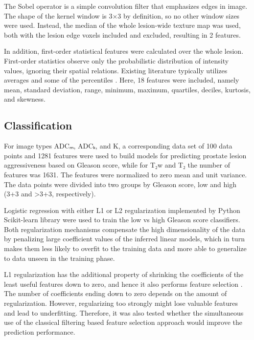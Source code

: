 \documentclass[10pt,letterpaper]{article}
\newcommand{\citep}{\cite}
\begin{document}
The Sobel operator \citep{Sobel1990} is a simple convolution filter that
emphasizes edges in image. The shape of the kernel window is 3×3 by definition,
so no other window sizes were used. Instead, the median of the whole lesion-wide
texture map was used, both with the lesion edge voxels included and excluded,
resulting in 2 features.

In addition, first-order statistical features were calculated over the whole
lesion. First-order statistics observe only the probabilistic distribution of
intensity values, ignoring their spatial relations. Existing literature
typically utilizes averages and some of the percentiles \citep{Shaish2016}.
Here, 18 features were included, namely mean, standard deviation, range,
minimum, maximum, quartiles, deciles, kurtosis, and skewness.


\subsection{Classification}

For image types ADCₘ, ADCₖ, and K, a corresponding data set of 100 data points and
1281 features were used to build models for predicting prostate lesion
aggressiveness based on Gleason score, while for T₂w and T₂ the number of
features was 1631. The features were normalized to zero mean and unit variance.
The data points were divided into two groups by Gleason score, low and high
(3+3 and >3+3, respectively).

Logistic regression with either L1 or L2 regularization \citep{Friedman2010}
implemented by Python Scikit-learn library \citep{Pedregosa2011} were used to
train the low vs high Gleason score classifiers. Both regularization mechanisms
compensate the high dimensionality of the data by penalizing large coefficient
values of the inferred linear models, which in turn makes them less likely to
overfit to the training data and more able to generalize to data unseen in the
training phase.

L1 regularization has the additional property of shrinking the coefficients of
the least useful features down to zero, and hence it also performs feature
selection \citep{Park2007}. The number of coefficients ending down to zero
depends on the amount of regularization. However, regularizing too strongly
might lose valuable features and lead to underfitting. Therefore, it was also
tested whether the simultaneous use of the classical filtering based feature
selection approach would improve the prediction performance.
\end{document}
